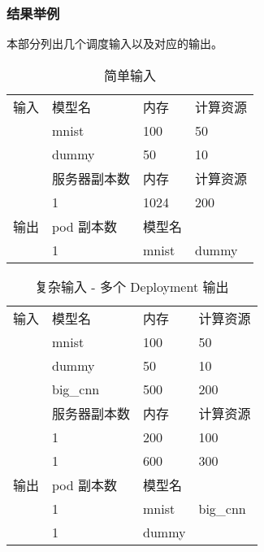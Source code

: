 \subsubsection{结果举例}

本部分列出几个调度输入以及对应的输出。

\begin{table}[]
\begin{tabular}{llll}
输入 & 模型名     & 内存    & 计算资源  \\
   & mnist   & 100   & 50    \\
   & dummy   & 50    & 10    \\
   & 服务器副本数  & 内存    & 计算资源  \\
   & 1       & 1024  & 200   \\
输出 & pod 副本数 & 模型名   &       \\
   & 1       & mnist & dummy
\end{tabular}
\caption{简单输入}
\end{table}

\begin{table}[]
\begin{tabular}{llll}
输入 & 模型名      & 内存    & 计算资源     \\
   & mnist    & 100   & 50       \\
   & dummy    & 50    & 10       \\
   & big\_cnn & 500   & 200      \\
   & 服务器副本数   & 内存    & 计算资源     \\
   & 1        & 200   & 100      \\
   & 1        & 600   & 300      \\
输出 & pod 副本数  & 模型名   &          \\
   & 1        & mnist & big\_cnn \\
   & 1        & dummy &
\end{tabular}
\caption{复杂输入 - 多个 Deployment 输出}
\end{table}

